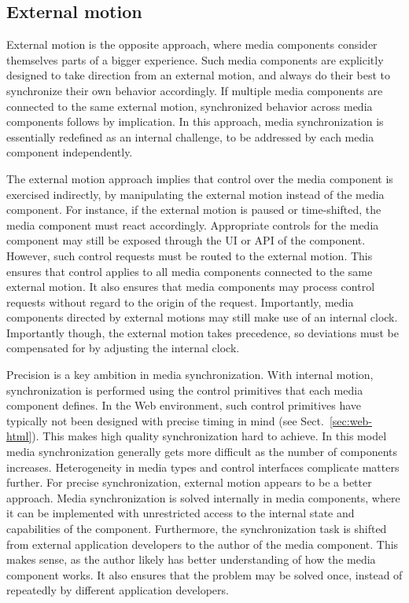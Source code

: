 \subsection {External motion}

External motion is the opposite approach, where media components consider
themselves parts of a bigger experience. Such media components are explicitly
designed to take direction from an external motion, and always do their best
to synchronize their own behavior accordingly. If multiple media components
are connected to the same external motion, synchronized behavior across media
components follows by implication. In this approach, media synchronization is
essentially redefined as an internal challenge, to be addressed by each media
component independently.



The external motion approach implies that control over the media component is
exercised indirectly, by manipulating the external motion instead of the media
component. For instance, if the external motion is paused or time-shifted, the
media component must react accordingly. Appropriate controls for the media
component may still be exposed through the UI or API of the component.
However, such control requests must be routed to the external motion. This
ensures that control applies to all media components connected to the same
external motion. It also ensures that media components may process control
requests without regard to the origin of the request. Importantly, media
components directed by external motions may still make use of an internal
clock. Importantly though, the external motion takes precedence, so deviations
must be compensated for by adjusting the internal clock.


Precision is a key ambition in media synchronization. With internal motion,
synchronization is performed using the control primitives that each media
component defines. In the Web environment, such control primitives have
typically not been designed with precise timing in mind 
(see Sect.~\ref{sec:web-html}). 
This makes high quality synchronization hard to achieve. In this
model media synchronization generally gets more difficult as the number of
components increases. Heterogeneity in media types and control interfaces
complicate matters further. For precise synchronization, external motion
appears to be a better approach. Media synchronization is solved internally in
media components, where it can be implemented with unrestricted access to the
internal state and capabilities of the component. Furthermore, the
synchronization task is shifted from external application developers to the
author of the media component. This makes sense, as the author likely has
better understanding of how the media component works. It also ensures that
the problem may be solved once, instead of repeatedly by different application
developers.


